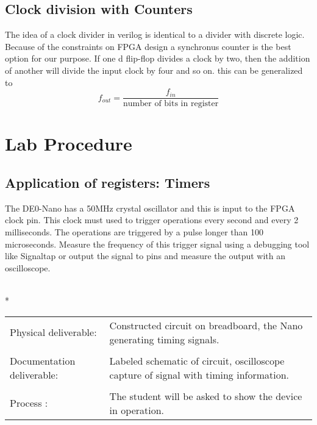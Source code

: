   \subsection{Clock division with Counters}
    The idea of a clock divider in verilog is identical to a divider with discrete logic. Because of the constraints on FPGA design a synchronus counter is the best option for our purpose. If one d flip-flop divides a clock by two, then the addition of another will divide the input clock by four and so on. this can be generalized to $$f_{out}=\frac{f_{in}}{\text{number of bits in register}}$$ 
    
\section{Lab Procedure}

  \subsection{Application of registers: Timers}
      The DE0-Nano has a 50MHz crystal oscillator and this is input to the FPGA clock pin.  This clock must used to trigger operations every second and every 2 milliseconds. The operations are triggered by a pulse longer than 100 microseconds. Measure the frequency  of this trigger signal using a debugging tool like Signaltap or output the signal to pins and measure the output with an oscilloscope.
     
    \vspace{15px}
    \begin{centering}
      \begin{fminipage}{.45\textwidth}
        \vspace{3px}
        \\*
        \vspace{10px}
        \begin{tabular}{p{1.8cm}  p{5.4cm}}
          \raggedright Physical deliverable:                          & Constructed circuit on breadboard,  the Nano generating timing signals.\\
          \\
          \raggedright Documentation deliverable:           & Labeled schematic of circuit,  oscilloscope capture of signal with timing information.\\
          \\
          Process :                                                                             & The student will be asked to show the device in operation.

        \end{tabular}
      \end{fminipage}
    \end{centering} 


